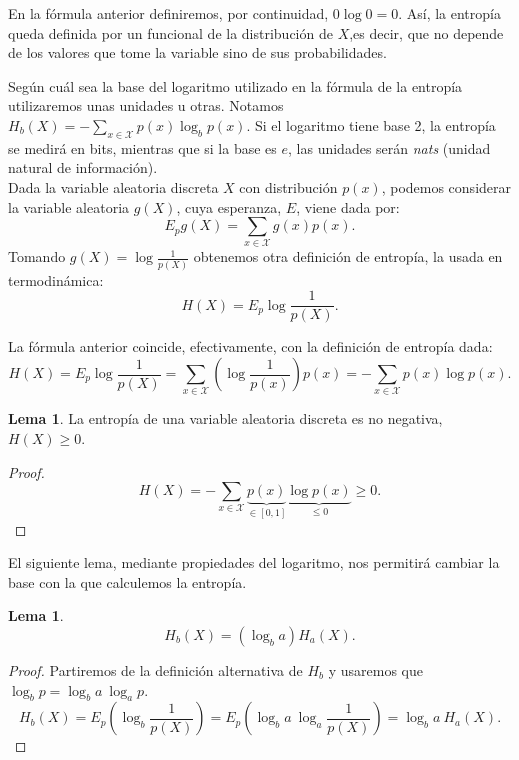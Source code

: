 \documentclass[10pt,a4paper]{article} %
\theoremstyle{definition}
\newtheorem{lemma}[theorem]{Lema}
\begin{document}
En la fórmula anterior definiremos, por continuidad, $0 \log 0 = 0$. Así, la entropía queda definida por un funcional de la distribución de $X$,es decir, que no depende de los valores que tome la variable sino de sus probabilidades.

Según cuál sea la base del logaritmo utilizado en la fórmula de la entropía utilizaremos unas unidades u otras. Notamos $H_b(X) = - \sum_{x\in \mathcal{X}} p(x) \log_b p(x)$. Si el logaritmo tiene base 2, la entropía se medirá en bits, mientras que si la base es $e$, las unidades serán \textit{nats} (unidad natural de información).\\

Dada la variable aleatoria discreta $X$ con distribución $p(x)$, podemos considerar la variable aleatoria $g(X)$, cuya esperanza, $E$, viene dada por:\[
E_pg(X) = \sum_{x\in \mathcal{X}}g(x)p(x).
\]
Tomando $g(X) = \log \frac{1}{p(X)}$ obtenemos otra definición de entropía, la usada en termodinámica:\[
H(X) = E_p \log \frac{1}{p(X)}.
\]

La fórmula anterior coincide, efectivamente, con la definición de entropía dada:\[
H(X) = E_p \log \frac{1}{p(X)} = \sum_{x\in \mathcal{X}}\left ( \log \frac{1}{p(x)} \right ) p(x) = - \sum_{x \in \mathcal{X}}p(x)\log p(x).
\]

\begin{lemma} La entropía de una variable aleatoria discreta es no negativa, $H(X) \ge 0$.
\end{lemma}
\begin{proof}
  \[H(X) = - \sum_{x \in \mathcal{X}}\underbrace{p(x)}_{\in [0,1]}\underbrace{\log p(x)}_{\leq 0} \ge 0.\]

\end{proof}

El siguiente lema, mediante propiedades del logaritmo, nos permitirá cambiar la base con la que calculemos la entropía.

\begin{lemma}\[H_b(X) = (\log_ba) H_a(X).\]
\end{lemma}
\begin{proof}
  Partiremos de la definición alternativa de $H_b$ y usaremos que $\log_bp = \log_ba\ \log_ap$.
  \[
  H_b(X) = E_p \left(\log_b \frac{1}{p(X)}\right ) = E_p \left ( \log_b a\ \log_a \frac{1}{p(X)} \right ) = \log_b{a}\ H_a(X).
  \]
\end{proof}
\end{document}
